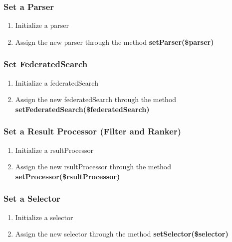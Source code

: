 \documentclass[letterpaper,10pt,english]{sphinxmanual}
\begin{document}
\subsubsection{Set a Parser}
\label{docs/scenarios/uss:set-a-parser}\begin{enumerate}
\item {} 
Initialize a parser

\item {} 
Assign the new parser through the method \textbf{setParser(\$parser)}

\end{enumerate}


\subsubsection{Set FederatedSearch}
\label{docs/scenarios/uss:set-federatedsearch}\begin{enumerate}
\item {} 
Initialize a federatedSearch

\item {} 
Assign the new federatedSearch through the method \textbf{setFederatedSearch(\$federatedSearch)}

\end{enumerate}


\subsubsection{Set a Result Processor (Filter and Ranker)}
\label{docs/scenarios/uss:set-a-result-processor-filter-and-ranker}\begin{enumerate}
\item {} 
Initialize a rsultProcessor

\item {} 
Assign the new rsultProcessor through the method \textbf{setProcessor(\$rsultProcessor)}

\end{enumerate}


\subsubsection{Set a Selector}
\label{docs/scenarios/uss:set-a-selector}\begin{enumerate}
\item {} 
Initialize a selector

\item {} 
Assign the new selector through the method \textbf{setSelector(\$selector)}

\end{enumerate}
\end{document}
